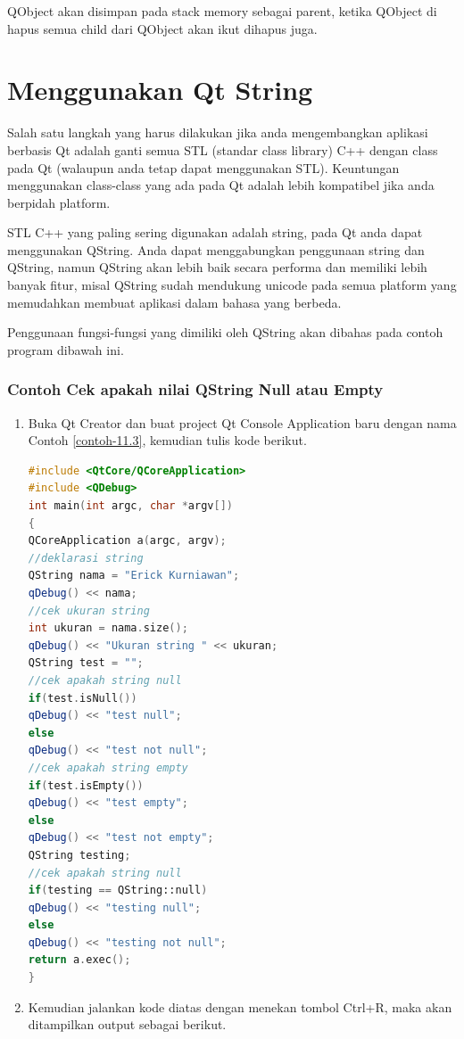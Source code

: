 QObject akan disimpan pada stack memory sebagai parent, ketika QObject
di hapus semua child dari QObject akan ikut dihapus juga.

\section{Menggunakan Qt String}\label{menggunakan-qt-string}

Salah satu langkah yang harus dilakukan jika anda mengembangkan aplikasi
berbasis Qt adalah ganti semua STL (standar class library) C++ dengan
class pada Qt (walaupun anda tetap dapat menggunakan STL). Keuntungan
menggunakan class-class yang ada pada Qt adalah lebih kompatibel jika
anda berpidah platform.

STL C++ yang paling sering digunakan adalah string, pada Qt anda dapat
menggunakan QString. Anda dapat menggabungkan penggunaan string dan
QString, namun QString akan lebih baik secara performa dan memiliki
lebih banyak fitur, misal QString sudah mendukung unicode pada semua
platform yang memudahkan membuat aplikasi dalam bahasa yang berbeda.

Penggunaan fungsi-fungsi yang dimiliki oleh QString akan dibahas pada
contoh program dibawah ini.

\subsubsection*{Contoh  Cek apakah nilai QString Null atau Empty}

\begin{enumerate}

\item
  Buka Qt Creator dan buat project Qt Console Application baru dengan
  nama Contoh \ref{contoh-11.3}, kemudian tulis kode berikut.

\begin{lstlisting}[language=c++, caption= Cek apakah nilai QString Null atau Empty, label=contoh-11.3]
#include <QtCore/QCoreApplication>
#include <QDebug>
int main(int argc, char *argv[])
{
QCoreApplication a(argc, argv);
//deklarasi string
QString nama = "Erick Kurniawan";
qDebug() << nama;
//cek ukuran string
int ukuran = nama.size();
qDebug() << "Ukuran string " << ukuran;
QString test = "";
//cek apakah string null
if(test.isNull())
qDebug() << "test null";
else
qDebug() << "test not null";
//cek apakah string empty
if(test.isEmpty())
qDebug() << "test empty";
else
qDebug() << "test not empty";
QString testing;
//cek apakah string null
if(testing == QString::null)
qDebug() << "testing null";
else
qDebug() << "testing not null";
return a.exec();
}
\end{lstlisting}
\item
  Kemudian jalankan kode diatas dengan menekan tombol Ctrl+R, maka akan
  ditampilkan output sebagai berikut.
\end{enumerate}

